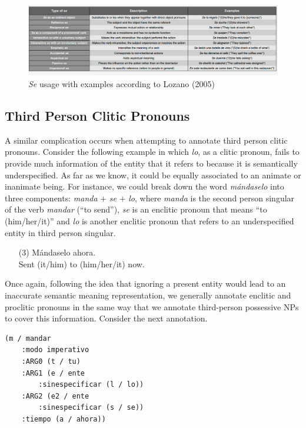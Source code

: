 \documentclass[10pt, a4paper]{article}
\begin{document}
\begin{figure}[ht]
\begin{center}
\includegraphics[scale=0.35]{se-usage}
\caption{\emph{Se} usage with examples according to Lozano (2005)}
\label{fig:se-usage}
\end{center}
\end{figure}

\subsection{Third Person Clitic Pronouns}\label{sec:third-person-clitic}

A similar complication occurs when attempting to annotate third person clitic pronouns. Consider the following example in which \emph{lo}, as a clitic pronoun, fails to provide much information of the entity that it refers to because it is semantically underspecified. As far as we know, it could be equally associated to an animate or inanimate being. For instance, we could break down the word \emph{m\'andaselo} into three components: \emph{manda} $+$ \emph{se} $+$ \emph{lo}, where  \emph{manda} is the second person singular of the verb \emph{mandar} (``to send''), \emph{se} is an enclitic pronoun that means ``to (him/her/it)'' and \emph{lo} is another enclitic pronoun that refers to an underspecified entity in third person singular. 

\begin{enumerate}
\item[(3)]M\'andaselo ahora.\\
Sent (it/him) to (him/her/it) now.
\end{enumerate}

Once again, following the idea that ignoring a present entity would lead to an inaccurate semantic meaning representation, we generally annotate enclitic and proclitic pronouns in the same way that we annotate third-person possessive NPs to cover this information. Consider the next annotation.
\begin{verbatim}
(m / mandar
    :modo imperativo
    :ARG0 (t / tu)
    :ARG1 (e / ente
        :sinespecificar (l / lo))
    :ARG2 (e2 / ente
        :sinespecificar (s / se))
    :tiempo (a / ahora))
\end{verbatim}
\end{document}
